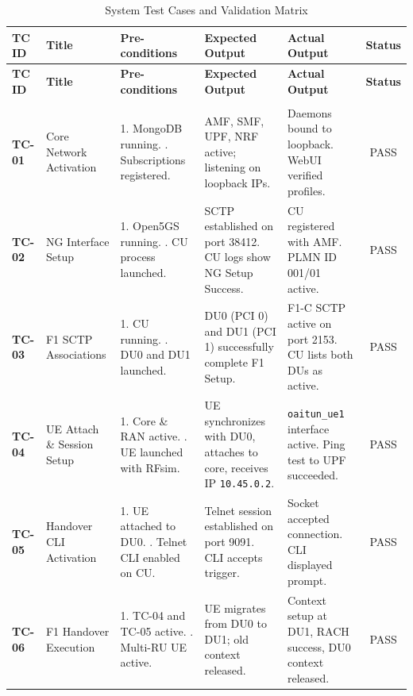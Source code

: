 \begin{longtable}{|p{1.5cm}|p{2.5cm}|p{3.5cm}|p{3.5cm}|p{1.5cm}|c|}
\hline
\textbf{TC ID} & \textbf{Title} & \textbf{Pre-conditions} & \textbf{Expected Output} & \textbf{Actual Output} & \textbf{Status} \\ \hline
\endfirsthead
\hline
\textbf{TC ID} & \textbf{Title} & \textbf{Pre-conditions} & \textbf{Expected Output} & \textbf{Actual Output} & \textbf{Status} \\ \hline
\endhead
\hline
\endfoot
\hline
\caption{System Test Cases and Validation Matrix}
\label{tab:testcases}
\\
\hline
\textbf{TC-01} & Core Network Activation & 1. MongoDB running. \newline 2. Subscriptions registered. & AMF, SMF, UPF, NRF active; listening on loopback IPs. & Daemons bound to loopback. WebUI verified profiles. & PASS \\ \hline
\textbf{TC-02} & NG Interface Setup & 1. Open5GS running. \newline 2. CU process launched. & SCTP established on port 38412. CU logs show NG Setup Success. & CU registered with AMF. PLMN ID 001/01 active. & PASS \\ \hline
\textbf{TC-03} & F1 SCTP Associations & 1. CU running. \newline 2. DU0 and DU1 launched. & DU0 (PCI 0) and DU1 (PCI 1) successfully complete F1 Setup. & F1-C SCTP active on port 2153. CU lists both DUs as active. & PASS \\ \hline
\textbf{TC-04} & UE Attach \& Session Setup & 1. Core \& RAN active. \newline 2. UE launched with RFsim. & UE synchronizes with DU0, attaches to core, receives IP \texttt{10.45.0.2}. & \texttt{oaitun\_ue1} interface active. Ping test to UPF succeeded. & PASS \\ \hline
\textbf{TC-05} & Handover CLI Activation & 1. UE attached to DU0. \newline 2. Telnet CLI enabled on CU. & Telnet session established on port 9091. CLI accepts trigger. & Socket accepted connection. CLI displayed prompt. & PASS \\ \hline
\textbf{TC-06} & F1 Handover Execution & 1. TC-04 and TC-05 active. \newline 2. Multi-RU UE active. & UE migrates from DU0 to DU1; old context released. & Context setup at DU1, RACH success, DU0 context released. & PASS \\ \hline
\end{longtable}


